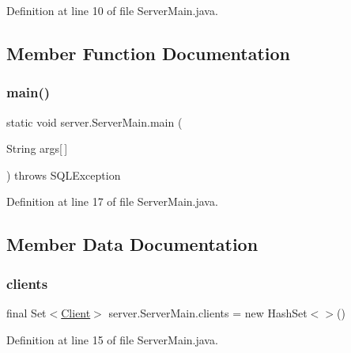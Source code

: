 Definition at line 10 of file Server\+Main.\+java.



\subsection{Member Function Documentation}
\hypertarget{classserver_1_1_server_main_a8813a033bf50655c4dbe0e00508f854d}{}\label{classserver_1_1_server_main_a8813a033bf50655c4dbe0e00508f854d} 
\subsubsection{\texorpdfstring{main()}{main()}}
{\footnotesize\ttfamily static void server.\+Server\+Main.\+main (\begin{DoxyParamCaption}\item[{String}]{args\mbox{[}$\,$\mbox{]} }\end{DoxyParamCaption}) throws S\+Q\+L\+Exception\hspace{0.3cm}{\ttfamily [static]}}



Definition at line 17 of file Server\+Main.\+java.



\subsection{Member Data Documentation}
\hypertarget{classserver_1_1_server_main_a9b8ba17f17513631d15fa701692dd82f}{}\label{classserver_1_1_server_main_a9b8ba17f17513631d15fa701692dd82f} 
\subsubsection{\texorpdfstring{clients}{clients}}
{\footnotesize\ttfamily final Set$<$\hyperlink{classserver_1_1conn_1_1_client}{Client}$>$ server.\+Server\+Main.\+clients = new Hash\+Set$<$$>$()\hspace{0.3cm}{\ttfamily [static]}}



Definition at line 15 of file Server\+Main.\+java.

\hypertarget{classserver_1_1_server_main_ad8e92f0aa15ba52ea24b2dd7b9bab924}{}\label{classserver_1_1_server_main_ad8e92f0aa15ba52ea24b2dd7b9bab924} 
